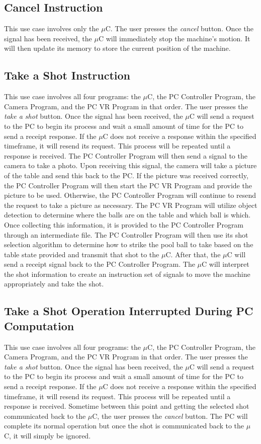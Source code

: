 \documentclass[titlepage]{article}
\begin{document}
\subsection{Cancel Instruction}
This use case involves only the $\mu$C. The user presses the \textit{cancel} button. Once the signal has been received, the $\mu$C will immediately stop the machine's motion. It will then update its memory to store the current position of the machine.
\newpage
\subsection{Take a Shot Instruction}
This use case involves all four programs: the $\mu$C, the PC Controller Program, the Camera Program, and the PC VR Program in that order. The user presses the \textit{take a shot} button. Once the signal has been received, the $\mu$C will send a request to the PC to begin its process and wait a small amount of time for the PC to send a receipt response. If the $\mu$C does not receive a response within the specified timeframe, it will resend its request. This process will be repeated until a response is received. The PC Controller Program will then send a signal to the camera to take a photo. Upon receiving this signal, the camera will take a picture of the table and send this back to the PC. If the picture was received correctly, the PC Controller Program will then start the PC VR Program and provide the picture to be used. Otherwise, the PC Controller Program will continue to resend the request to take a picture as necessary. The PC VR Program will utilize object detection to determine where the balls are on the table and which ball is which. Once collecting this information, it is provided to the PC Controller Program through an intermediate file. The PC Controller Program will then use its shot selection algorithm to determine how to strike the pool ball to take based on the table state provided and transmit that shot to the $\mu$C. After that, the $\mu$C will send a receipt signal back to the PC Controller Program. The $\mu$C will interpret the shot information to create an instruction set of signals to move the machine appropriately and take the shot.
\subsection{Take a Shot Operation Interrupted During PC Computation}
This use case involves all four programs: the $\mu$C, the PC Controller Program, the Camera Program, and the PC VR Program in that order. The user presses the \textit{take a shot} button. Once the signal has been received, the $\mu$C will send a request to the PC to begin its process and wait a small amount of time for the PC to send a receipt response. If the $\mu$C does not receive a response within the specified timeframe, it will resend its request. This process will be repeated until a response is received. Sometime between this point and getting the selected shot communicated back to the $\mu$C, the user presses the \textit{cancel} button. The PC will complete its normal operation but once the shot is communicated back to the $\mu$C, it will simply be ignored.
\end{document}
